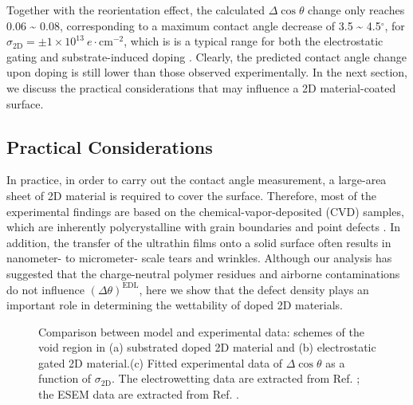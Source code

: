 Together with the reorientation effect, the calculated \(\Delta \cos
\theta\) change only reaches 0.06 \textasciitilde{} 0.08, corresponding to a maximum
contact angle decrease of 3.5 \textasciitilde{} 4.5\(^{\circ}\), for
\(\sigma_{\mathrm{2D}}=\pm1\times10^{13}\ e\cdot \mathrm{cm}^{-2}\),
which is is a typical range for both the electrostatic gating
\cite{hong_mechanism_2016} and substrate-induced doping
\cite{ashraf_doping-induced_2016}. Clearly, the predicted contact angle
change upon doping is still lower than those observed
experimentally. In the next section, we discuss the practical
considerations that may influence a 2D material-coated surface.


\subsection{Practical Considerations}
\label{sec:orgb997597}

In practice, in order to
carry out the contact angle measurement, a large-area sheet of 2D
material is required to cover the surface. Therefore, most of the
experimental findings are based on the chemical-vapor-deposited (CVD)
samples, which are inherently polycrystalline with grain boundaries
and point defects \cite{Banhart_2011_defect}.  In addition, the transfer
of the ultrathin films onto a solid surface often results in
nanometer- to micrometer- scale tears and wrinkles. Although our
analysis has suggested that the charge-neutral polymer residues and
airborne contaminations do not influence \((\Delta
\theta)^{\mathrm{EDL}}\), here we show that the defect density plays an
important role in determining the wettability of doped 2D
materials.

\begin{figure}[htbp]
\centering
\caption{\label{fig:f-nc-exp} Comparison between model and
  experimental data: schemes of the void region in (a) substrated
  doped 2D material and (b) electrostatic gated 2D material.(c) Fitted
  experimental data of \(\Delta\cos\theta\) as a function of
  \(\sigma_{\mathrm{2D}}\). The electrowetting data are extracted from
  Ref. \cite{hong_mechanism_2016}; the ESEM data are extracted from
  Ref. \cite{ashraf_doping-induced_2016}.}
\end{figure}

